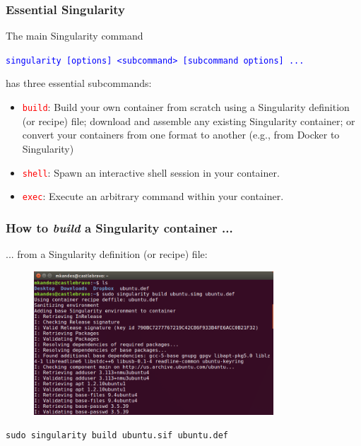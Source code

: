 \documentclass{beamer}
\begin{document}
\begin{frame}
   \frametitle{Essential Singularity}
   The main Singularity command
   \begin{center}
      \textcolor{blue}{\lstinline{singularity [options] <subcommand> [subcommand options] ...}}
   \end{center}
   has three essential subcommands:
   \begin{itemize}
      \setlength\itemsep{1.0em}
      \item \textcolor{red}{\lstinline{build}}: Build your own container 
         from scratch using a Singularity definition (or recipe) file; 
         download and assemble any existing Singularity container; or 
         convert your containers from one format to another (e.g., from 
         Docker to Singularity)
      \item \textcolor{red}{\lstinline{shell}}: Spawn an interactive shell 
         session in your container.
      \item \textcolor{red}{\lstinline{exec}}: Execute an arbitrary 
         command within your container.
   \end{itemize}
\end{frame}

\begin{frame}
   \frametitle{How to \textit{build} a Singularity container ...}
   ... from a Singularity definition (or recipe) file:
   \begin{figure}[htbp]
      \includegraphics[width=0.8\textwidth]{images/singularity-build-deffile-start.png}
   \end{figure}
   \lstinline{sudo singularity build ubuntu.sif ubuntu.def}
\end{frame}
\end{document}
